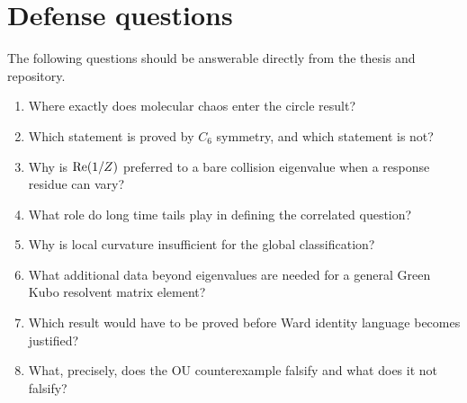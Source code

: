 \section{Defense questions}
The following questions should be answerable directly from the thesis and repository.
\begin{enumerate}[label=\arabic*.]
\item Where exactly does molecular chaos enter the circle result?
\item Which statement is proved by $C_6$ symmetry, and which statement is not?
\item Why is $\operatorname{Re}(1/Z)$ preferred to a bare collision eigenvalue when a response residue can vary?
\item What role do long time tails play in defining the correlated question?
\item Why is local curvature insufficient for the global classification?
\item What additional data beyond eigenvalues are needed for a general Green Kubo resolvent matrix element?
\item Which result would have to be proved before Ward identity language becomes justified?
\item What, precisely, does the OU counterexample falsify and what does it not falsify?
\end{enumerate}
